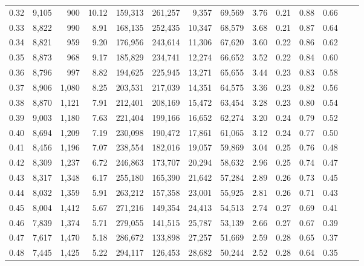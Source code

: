 \begin{tabular}{rrrrrrrrrrrrrr}
0.32 &  9,105 &    900 &   10.12 &  159,313 &  261,257 &   9,357 &  69,569 &  3.76 &  0.21 &  0.88 &      0.66 \\
0.33 &  8,822 &    990 &    8.91 &  168,135 &  252,435 &  10,347 &  68,579 &  3.68 &  0.21 &  0.87 &      0.64 \\
0.34 &  8,821 &    959 &    9.20 &  176,956 &  243,614 &  11,306 &  67,620 &  3.60 &  0.22 &  0.86 &      0.62 \\
0.35 &  8,873 &    968 &    9.17 &  185,829 &  234,741 &  12,274 &  66,652 &  3.52 &  0.22 &  0.84 &      0.60 \\
0.36 &  8,796 &    997 &    8.82 &  194,625 &  225,945 &  13,271 &  65,655 &  3.44 &  0.23 &  0.83 &      0.58 \\
0.37 &  8,906 &  1,080 &    8.25 &  203,531 &  217,039 &  14,351 &  64,575 &  3.36 &  0.23 &  0.82 &      0.56 \\
0.38 &  8,870 &  1,121 &    7.91 &  212,401 &  208,169 &  15,472 &  63,454 &  3.28 &  0.23 &  0.80 &      0.54 \\
0.39 &  9,003 &  1,180 &    7.63 &  221,404 &  199,166 &  16,652 &  62,274 &  3.20 &  0.24 &  0.79 &      0.52 \\
0.40 &  8,694 &  1,209 &    7.19 &  230,098 &  190,472 &  17,861 &  61,065 &  3.12 &  0.24 &  0.77 &      0.50 \\
0.41 &  8,456 &  1,196 &    7.07 &  238,554 &  182,016 &  19,057 &  59,869 &  3.04 &  0.25 &  0.76 &      0.48 \\
0.42 &  8,309 &  1,237 &    6.72 &  246,863 &  173,707 &  20,294 &  58,632 &  2.96 &  0.25 &  0.74 &      0.47 \\
0.43 &  8,317 &  1,348 &    6.17 &  255,180 &  165,390 &  21,642 &  57,284 &  2.89 &  0.26 &  0.73 &      0.45 \\
0.44 &  8,032 &  1,359 &    5.91 &  263,212 &  157,358 &  23,001 &  55,925 &  2.81 &  0.26 &  0.71 &      0.43 \\
0.45 &  8,004 &  1,412 &    5.67 &  271,216 &  149,354 &  24,413 &  54,513 &  2.74 &  0.27 &  0.69 &      0.41 \\
0.46 &  7,839 &  1,374 &    5.71 &  279,055 &  141,515 &  25,787 &  53,139 &  2.66 &  0.27 &  0.67 &      0.39 \\
0.47 &  7,617 &  1,470 &    5.18 &  286,672 &  133,898 &  27,257 &  51,669 &  2.59 &  0.28 &  0.65 &      0.37 \\
0.48 &  7,445 &  1,425 &    5.22 &  294,117 &  126,453 &  28,682 &  50,244 &  2.52 &  0.28 &  0.64 &      0.35 \\

\end{tabular}
